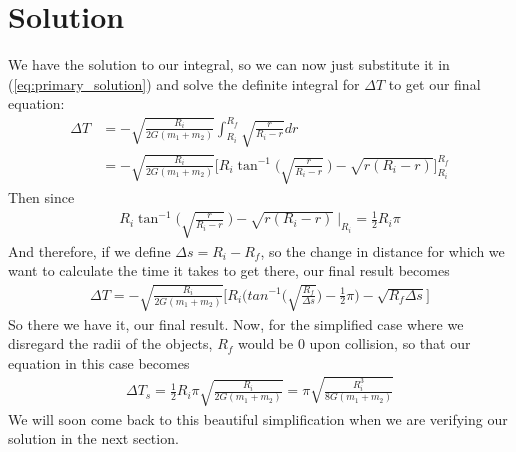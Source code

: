 \documentclass{article}
\begin{document}
\section{Solution}
We have the solution to our integral, so we can now just substitute it in (\ref{eq:primary_solution}) and solve the definite integral for $\Delta T$ to get our final equation:
\begin{align}
\Delta T &=  - \sqrt{\frac{R_i}{2G(m_1 + m_2)}} \int_{R_i}^{R_f} \sqrt{\frac{r}{R_i - r}} dr\\
&=   - \sqrt{\frac{R_i}{2G(m_1 + m_2)}} \biggl[  R_i \tan^{-1}\biggl(\sqrt{\frac{r}{R_i - r}} ~ \biggr) -\sqrt{r( R_i - r)} \biggr]_{R_i}^{R_f}
\end{align}
Then since
\begin{align}
     R_i \tan^{-1}\biggl(\sqrt{\frac{r}{R_i - r}} ~ \biggr) -\sqrt{r( R_i - r)} ~ \bigg|_{R_i} = \frac{1}{2} R_i \pi
\end{align}
And therefore, if we define $\Delta s = R_i - R_f$, so the change in distance for which we want to calculate the time it takes to get there, our final result becomes
\begin{align}
    \Delta T =  - \sqrt{\frac{R_i}{2G(m_1 + m_2)}} \biggl[ R_i \biggl( tan^{-1}\biggl(\sqrt{\frac{R_f}{ \Delta s}}\biggr) - \frac{1}{2}\pi \biggr) - \sqrt{R_f \Delta s } \biggr]
\end{align}
So there we have it, our final result. Now, for the simplified case where we disregard the radii of the objects, $R_f$ would be $0$ upon collision, so that our equation in this case becomes
\begin{align}
    \label{eq:simplified_kepler}
    \Delta T_{s} =  \frac{1}{2} R_i \pi \sqrt{\frac{R_i}{2G(m_1 + m_2)}} = \pi \sqrt{\frac{R_i^3}{8G(m_1 + m_2)}}
\end{align}
We will soon come back to this beautiful simplification when we are verifying our solution in the next section.
\end{document}
